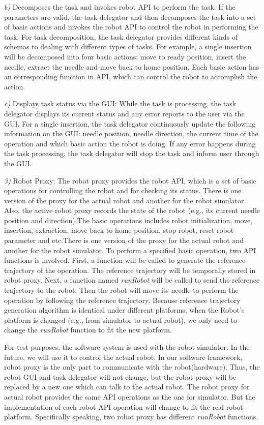 \emph{b)}	Decomposes the task and invokes robot API to perform the task:  If the parameters are valid, the task delegator and then decomposes the task into a set of basic actions and invokes the robot API to control the robot in performing the task. For task decomposition, the task delegator provides different kinds of schemas to dealing with different types of tasks. For example, a single insertion will be decomposed into four basic actions: move to ready position, insert the needle, extract the needle and move back to home position. Each basic action has an corresponding function in API, which can control the robot to accomplish the action.

\emph{c)}	Displays task status via the GUI: While the task is processing, the task delegator displays its current status and any error reports to the user via the GUI. For a single insertion, the task delegator continuously update the following information on the GUI: needle position, needle direction, the current time of the operation and which basic action the robot is doing. If any error happens during the task processing, the task delegator will stop the task and inform user through the GUI.

\emph{3)}	Robot Proxy: The robot proxy provides the robot API, which is a set of basic operations for controlling the robot and for checking its status. There is one version of the proxy for the actual robot and another for the robot simulator. Also, the active robot proxy records the state of the robot (e.g., its current needle position and direction).The basic operations includes robot initialization, move, insertion, extraction, move back to home position, stop robot,  reset robot parameter and etc.There is one version of the proxy for the actual robot and another for the robot simulator. To perform a specified basic operation, two API functions is involved. First, a function will be called to generate the reference trajectory of the operation. The reference trajectory will be temporally stored in robot proxy. Next, a function named \emph{runRobot} will be called to send the reference trajectory to the robot. Then the robot will move its needle to perform the operation by following the reference trajectory. Because reference trajectory generation algorithm is identical under different platforms, when the Robot's platform is changed (e.g., from simulator to actual robot), we only need to change the \emph{runRobot} function to fit the new platform.

For test purposes, the software system is used with the robot simulator. In the future, we will use it to control the actual robot. In our software framework, robot proxy is the only part to communicate with the robot(hardware). Thus, the robot GUI and task delegator will not change, but the robot proxy will be replaced by a new one which can talk to the actual robot. The robot proxy for actual robot provides the same API operations as the one for simulator. But the implementation of each robot API operation will change to fit the real robot platform. Specifically speaking, two robot proxy has different \emph{runRobot} functions.

